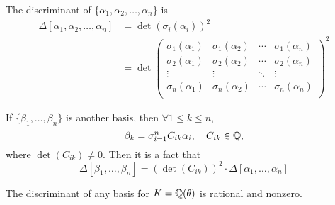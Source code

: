 \begin{definition}
    The discriminant of $\{\alpha_1, \alpha_2, \dots, \alpha_n\}$ is
    \begin{align*}
        \Delta[\alpha_1, \alpha_2, \dots, \alpha_n] & = \det\left(\sigma_i(\alpha_i)\right)^2 \\
                                                    & = \det
        \begin{pmatrix}
            \sigma_1(\alpha_1) & \sigma_1(\alpha_2) & \cdots & \sigma_1(\alpha_n) \\
            \sigma_2(\alpha_1) & \sigma_2(\alpha_2) & \cdots & \sigma_2(\alpha_n) \\
            \vdots             & \vdots             & \ddots & \vdots             \\
            \sigma_n(\alpha_1) & \sigma_n(\alpha_2) & \cdots & \sigma_n(\alpha_n) \\
        \end{pmatrix}^2
    \end{align*}
\end{definition}
If $\{\beta_1, \dots, \beta_n\}$ is another basis, then $\forall 1\leq k\leq n$,
\[\beta_k = \sigma_{i = 1}^n C_{ik}\alpha_i, \quad C_{ik}\in \mathbb Q,\]
where $\det(C_{ik})\neq 0$. Then it is a fact that
\[\Delta[\beta_1, \dots, \beta_n] = \left(\det(C_{ik})\right)^2\cdot \Delta[\alpha_1, \dots, \alpha_n]\]
\begin{theorem}
    The discriminant of any basis for $K = \mathbb Q(\theta)$ is rational and nonzero.
\end{theorem}
